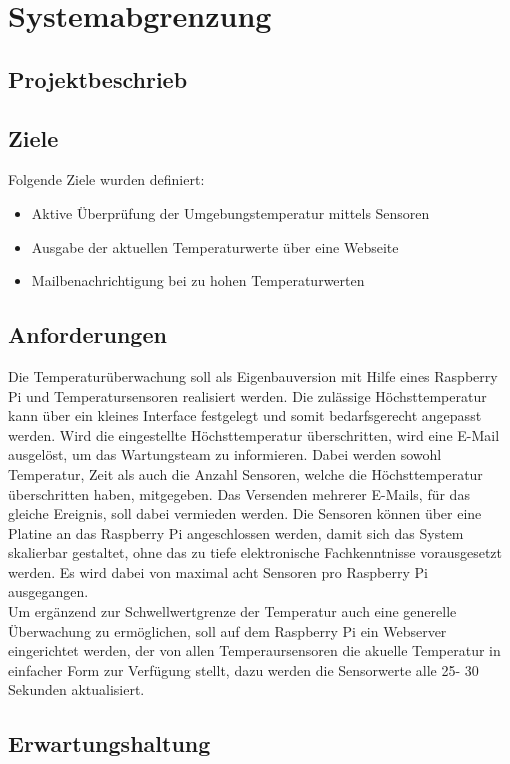 \section{Systemabgrenzung}
\subsection{Projektbeschrieb}
\subsection{Ziele}
Folgende Ziele wurden definiert:
\begin{itemize}
\item Aktive Überprüfung der Umgebungstemperatur mittels Sensoren
\item Ausgabe der aktuellen Temperaturwerte über eine Webseite
\item Mailbenachrichtigung bei zu hohen Temperaturwerten
\end{itemize}

\subsection{Anforderungen}
Die Temperaturüberwachung soll als Eigenbauversion mit Hilfe eines Raspberry Pi und Temperatursensoren realisiert werden. Die zulässige Höchsttemperatur kann über ein kleines Interface festgelegt und somit bedarfsgerecht angepasst werden. Wird die eingestellte Höchsttemperatur überschritten, wird eine E-Mail ausgelöst, um das Wartungsteam zu informieren. Dabei werden sowohl Temperatur, Zeit als auch die Anzahl Sensoren, welche die Höchsttemperatur überschritten haben, mitgegeben. Das Versenden mehrerer E-Mails, für das gleiche Ereignis, soll dabei vermieden werden. Die Sensoren können über eine Platine an das Raspberry Pi angeschlossen werden, damit sich das System skalierbar gestaltet, ohne das zu tiefe elektronische Fachkenntnisse vorausgesetzt werden. Es wird dabei von maximal acht Sensoren pro Raspberry Pi ausgegangen.\\
Um ergänzend zur Schwellwertgrenze der Temperatur auch eine generelle Überwachung zu ermöglichen, soll auf dem Raspberry Pi ein Webserver eingerichtet werden, der von allen Temperaursensoren die akuelle Temperatur in einfacher Form zur Verfügung stellt, dazu werden die Sensorwerte alle 25- 30 Sekunden aktualisiert.
\subsection{Erwartungshaltung}